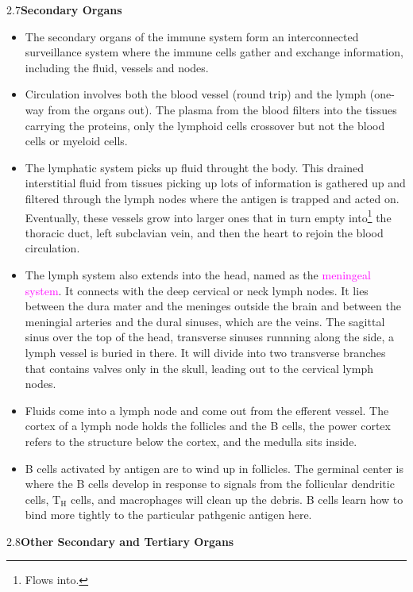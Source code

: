 \documentclass[UTF8]{book}
\newcommand{\concept}[1]{\textcolor{magenta}{#1}}
\begin{document}
2.7\quad \textbf{Secondary Organs}
\begin{itemize}
\item The secondary organs of the immune system form an interconnected surveillance system where the immune cells gather and exchange information, including the fluid, vessels and nodes.
\item Circulation involves both the blood vessel (round trip) and the lymph (one-way from the organs out). The plasma from the blood filters into the tissues carrying the proteins, only the lymphoid cells crossover but not the blood cells or myeloid cells.  
\item The lymphatic system picks up fluid throught the body. This drained interstitial fluid from tissues picking up lots of information is gathered up and filtered through the lymph nodes where the antigen is trapped and acted on. Eventually, these vessels grow into larger ones that in turn empty into\footnote{Flows into.} the thoracic duct, left subclavian vein, and then the heart to rejoin the blood circulation.
\item The lymph system also extends into the head, named as the \concept{meningeal system}. It connects with the deep cervical or neck lymph nodes. It lies between the dura mater and the meninges outside the brain and between the meningial arteries and the dural sinuses, which are the veins. The sagittal sinus over the top of the head, transverse sinuses runnning along the side, a lymph vessel is buried in there. It will divide into two transverse branches that contains valves only in the skull, leading out to the cervical lymph nodes. 
\item Fluids come into a lymph node and come out from the efferent vessel. The cortex of a lymph node holds the follicles and the B cells, the power cortex refers to the structure below the cortex, and the medulla sits inside.
\item B cells activated by antigen are to wind up in follicles. The germinal center is where the B cells develop in response to signals from the follicular dendritic cells, $\mathrm{T_H}$ cells, and macrophages will clean up the debris. B cells learn how to bind more tightly to the particular pathgenic antigen here.
\end{itemize}
2.8\quad \textbf{Other Secondary and Tertiary Organs}
\end{document}
